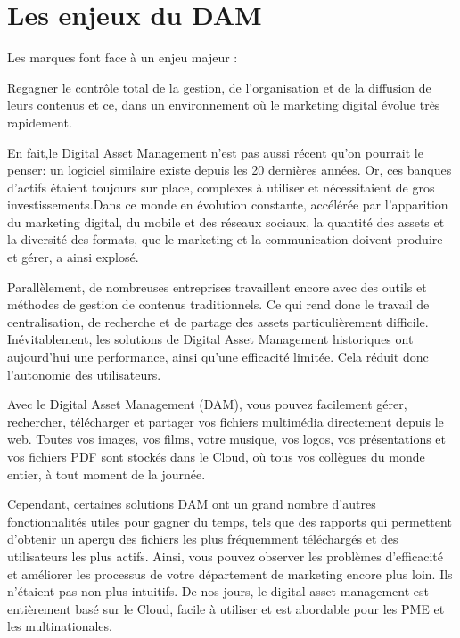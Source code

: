 \newpage
\section{Les enjeux du DAM }
 
Les marques font face à un enjeu majeur :

Regagner le contrôle total de la gestion, de l’organisation et de la diffusion de leurs contenus et ce, dans un environnement où le marketing digital évolue très rapidement. 
\newline

En fait,le Digital Asset Management n’est pas aussi récent qu’on pourrait le penser: un logiciel similaire existe depuis les 20 dernières années. Or, ces banques d’actifs étaient toujours sur place, complexes à utiliser et nécessitaient de gros investissements.Dans ce monde en évolution constante, accélérée par l’apparition du marketing digital, du mobile et des réseaux sociaux, la quantité des assets et la diversité des formats, que le marketing et la communication doivent produire et gérer, a ainsi explosé.
 \newline
 
Parallèlement, de nombreuses entreprises travaillent encore avec des outils et méthodes de gestion de contenus traditionnels. Ce qui rend donc le travail de centralisation, de recherche et de partage des assets particulièrement difficile. Inévitablement, les solutions de Digital Asset Management historiques ont aujourd’hui une performance, ainsi qu’une efficacité limitée. Cela réduit donc l’autonomie des utilisateurs.
 \newline
 
Avec le Digital Asset Management (DAM), vous pouvez facilement gérer, rechercher, télécharger et partager vos fichiers multimédia directement depuis le web. Toutes vos images, vos films, votre musique, vos logos, vos présentations et vos fichiers PDF sont stockés dans le Cloud, où tous vos collègues du monde entier, à tout moment de la journée.
\newline

  Cependant, certaines solutions DAM ont un grand nombre d’autres fonctionnalités utiles pour gagner du temps, tels que des rapports qui permettent d’obtenir un aperçu des fichiers les plus fréquemment téléchargés et des utilisateurs les plus actifs.
Ainsi, vous pouvez observer les problèmes d’efficacité et améliorer les processus de votre département de marketing encore plus loin. Ils n’étaient pas non plus intuitifs. De nos jours, le digital asset management est entièrement basé sur le Cloud, facile à utiliser et est abordable pour les PME et les multinationales.
\newline

